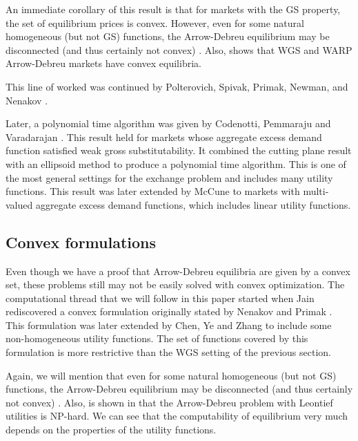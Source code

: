 \documentclass[12pt]{article}
\begin{document}
An immediate corollary of this result is that for markets with the GS property,
the set of equilibrium prices is convex.
However, even for some natural homogeneous (but not GS) functions,
the Arrow-Debreu equilibrium may be disconnected
(and thus certainly not convex) \cite{gjerstad1996multiple}.
Also, \cite[p.~608]{mas1995microeconomic} shows that WGS and WARP Arrow-Debreu
markets have convex equilibria.

This line of worked was continued by Polterovich, Spivak, Primak, Newman,
and Nenakov \cite{nenakov1983algorithm,newman1992complexity,primak1984algorithm,primak1993converging}.

Later, a polynomial time algorithm was given by Codenotti, Pemmaraju and
Varadarajan \cite{codenotti2005polynomial}.
This result held for markets whose aggregate excess demand function satisfied
weak gross substitutability.
It combined the cutting plane result with an ellipsoid method to produce a
polynomial time algorithm.
This is one of the most general settings for the exchange problem and includes
many utility functions. This result was later extended by McCune
\cite{mccune2007extending} to markets with multi-valued aggregate excess
demand functions, which includes linear utility functions.

\subsection{Convex formulations}
Even though we have a proof that Arrow-Debreu equilibria are given by a
convex set, these problems still may not be easily solved with convex
optimization.
The computational thread that we will follow in this paper started when
Jain \cite{jain2007polynomial} rediscovered a convex formulation originally
stated by Nenakov and Primak \cite{nenakov1983algorithm}.
This formulation was later extended by Chen, Ye and
Zhang \cite{chen2007note,chen2010equilibrium} to include some non-homogeneous
utility functions.
The set of functions covered by this formulation is more restrictive than the
WGS setting of the previous section. 

Again, we will mention that even for some natural homogeneous (but not GS)
functions, the Arrow-Debreu equilibrium may be disconnected
(and thus certainly not convex) \cite{gjerstad1996multiple}.
Also, is shown in \cite{codenotti2006leontief} that the Arrow-Debreu
problem with Leontief utilities is NP-hard.
We can see that the computability of equilibrium very much depends on the
properties of the utility functions.
\end{document}
